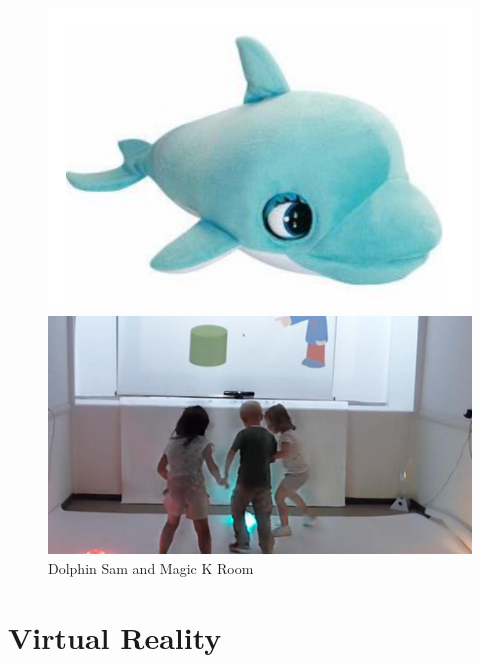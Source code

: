 \begin{figure}[H]
\centering
\begin{minipage}[c]{.40\textwidth}
\includegraphics[width=1\textwidth]{immagini/delfino.png}
\end{minipage}%
\hspace{10mm}%
\begin{minipage}[c]{.40\textwidth}
\includegraphics[width=1\textwidth]{immagini/stanzamagica.jpg}
\end{minipage}
\caption{Dolphin Sam and Magic K Room}\label{fig:smartimages}
\end{figure}
\section{Virtual Reality}
